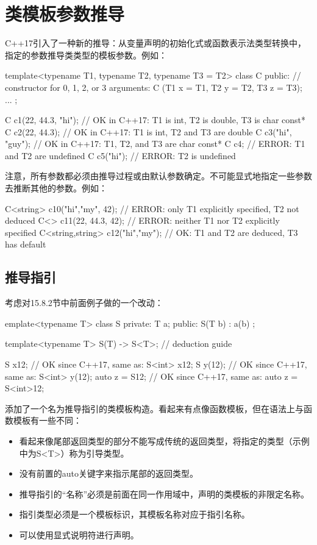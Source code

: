 \section{类模板参数推导}

C++17引入了一种新的推导：从变量声明的初始化式或函数表示法类型转换中，指定的参数推导类类型的模板参数。例如：

\begin{cpp}
template<typename T1, typename T2, typename T3 = T2>
class C {
	public:
	// constructor for 0, 1, 2, or 3 arguments:
	C (T1 x = T1{}, T2 y = T2{}, T3 z = T3{});
	...
};

C c1(22, 44.3, "hi"); // OK in C++17: T1 is int, T2 is double, T3 is char const*
C c2(22, 44.3); // OK in C++17: T1 is int, T2 and T3 are double
C c3("hi", "guy"); // OK in C++17: T1, T2, and T3 are char const*
C c4; // ERROR: T1 and T2 are undefined
C c5("hi"); // ERROR: T2 is undefined
\end{cpp}

注意，所有参数都必须由推导过程或由默认参数确定。不可能显式地指定一些参数去推断其他的参数。例如：

\begin{cpp}
C<string> c10("hi","my", 42); // ERROR: only T1 explicitly specified, T2 not deduced
C<> c11(22, 44.3, 42); // ERROR: neither T1 nor T2 explicitly specified
C<string,string> c12("hi","my"); // OK: T1 and T2 are deduced, T3 has default
\end{cpp}

\subsection{推导指引}

考虑对15.8.2节中前面例子做的一个改动：

\begin{cpp}
emplate<typename T>
class S {
	private:
	T a;
	public:
	S(T b) : a(b) {
	}
};

template<typename T> S(T) -> S<T>; // deduction guide

S x{12}; // OK since C++17, same as: S<int> x{12};
S y(12); // OK since C++17, same as: S<int> y(12);
auto z = S{12}; // OK since C++17, same as: auto z = S<int>{12};
\end{cpp}

添加了一个名为推导指引的类模板构造。看起来有点像函数模板，但在语法上与函数模板有一些不同：

\begin{itemize}
\item 
看起来像尾部返回类型的部分不能写成传统的返回类型，将指定的类型（示例中为S<T>）称为引导类型。

\item 
没有前置的auto关键字来指示尾部的返回类型。

\item 
推导指引的“名称”必须是前面在同一作用域中，声明的类模板的非限定名称。

\item 
指引类型必须是一个模板标识，其模板名称对应于指引名称。

\item 
可以使用显式说明符进行声明。
\end{itemize}	

